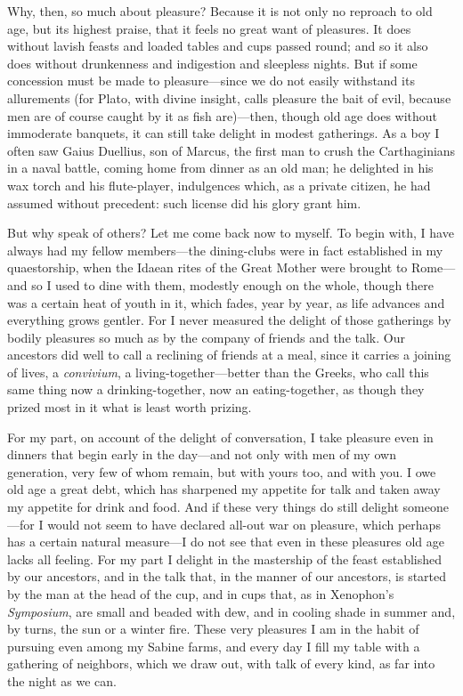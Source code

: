  Why, then, so much about pleasure? Because it is not only no reproach to old age, but its highest praise, that it feels no great want of pleasures. It does without lavish feasts and loaded tables and cups passed round; and so it also does without drunkenness and indigestion and sleepless nights. But if some concession must be made to pleasure—since we do not easily withstand its allurements (for Plato, with divine insight, calls pleasure the bait of evil, because men are of course caught by it as fish are)—then, though old age does without immoderate banquets, it can still take delight in modest gatherings. As a boy I often saw Gaius Duellius, son of Marcus, the first man to crush the Carthaginians in a naval battle, coming home from dinner as an old man; he delighted in his wax torch and his flute-player, indulgences which, as a private citizen, he had assumed without precedent: such license did his glory grant him.

 But why speak of others? Let me come back now to myself. To begin with, I have always had my fellow members—the dining-clubs were in fact established in my quaestorship, when the Idaean rites of the Great Mother were brought to Rome—and so I used to dine with them, modestly enough on the whole, though there was a certain heat of youth in it, which fades, year by year, as life advances and everything grows gentler. For I never measured the delight of those gatherings by bodily pleasures so much as by the company of friends and the talk. Our ancestors did well to call a reclining of friends at a meal, since it carries a joining of lives, a \textit{convivium}, a living-together—better than the Greeks, who call this same thing now a drinking-together, now an eating-together, as though they prized most in it what is least worth prizing.

 For my part, on account of the delight of conversation, I take pleasure even in dinners that begin early in the day—and not only with men of my own generation, very few of whom remain, but with yours too, and with you. I owe old age a great debt, which has sharpened my appetite for talk and taken away my appetite for drink and food. And if these very things do still delight someone—for I would not seem to have declared all-out war on pleasure, which perhaps has a certain natural measure—I do not see that even in these pleasures old age lacks all feeling. For my part I delight in the mastership of the feast established by our ancestors, and in the talk that, in the manner of our ancestors, is started by the man at the head of the cup, and in cups that, as in Xenophon's \textit{Symposium}, are small and beaded with dew, and in cooling shade in summer and, by turns, the sun or a winter fire. These very pleasures I am in the habit of pursuing even among my Sabine farms, and every day I fill my table with a gathering of neighbors, which we draw out, with talk of every kind, as far into the night as we can.

